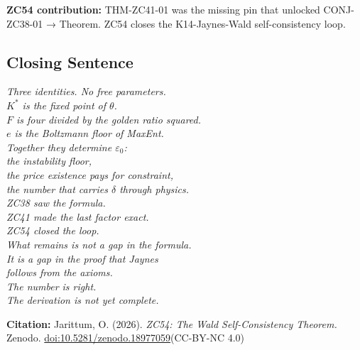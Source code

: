 \documentclass[12pt, a4paper]{article}
\begin{document}
\begin{genealogybox}
\medskip
\textbf{ZC54 contribution:} THM-ZC41-01 was the missing pin
that unlocked CONJ-ZC38-01 → Theorem. ZC54 closes the
K14-Jaynes-Wald self-consistency loop.
\end{genealogybox}

\subsection{Closing Sentence}

\begin{center}
\textit{%
Three identities. No free parameters.\\[0.5em]
$K^*$ is the fixed point of $\theta$.\\
$F$ is four divided by the golden ratio squared.\\
$e$ is the Boltzmann floor of MaxEnt.\\[0.3em]
Together they determine $\varepsilon_0$:\\
the instability floor,\\
the price existence pays for constraint,\\
the number that carries $\delta$ through physics.\\[0.5em]
ZC38 saw the formula.\\
ZC41 made the last factor exact.\\
ZC54 closed the loop.\\[0.3em]
What remains is not a gap in the formula.\\
It is a gap in the proof that Jaynes\\
follows from the axioms.\\
The number is right.\\
The derivation is not yet complete.}
\end{center}

\bigskip
\begin{center}
\textbf{Citation:} Jarittum, O. (2026).
\textit{ZC54: The Wald Self-Consistency Theorem.}
Zenodo.
\href{https://doi.org/10.5281/zenodo.18977059}%
{doi:10.5281/zenodo.18977059}\quad (CC-BY-NC 4.0)
\end{center}



\end{document}

